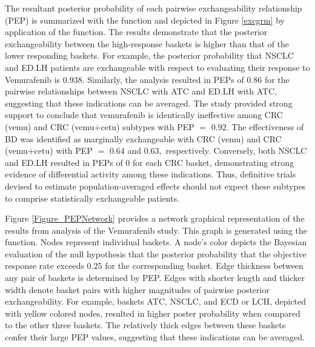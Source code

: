 The resultant posterior probability of each pairwise exchangeability relationship (PEP) is summarized with the  function and depicted in Figure \ref{excgrm} by application of the  function. The results demonstrate that the posterior exchangeability between the high-response baskets is higher than that of the lower responding baskets. For example, the posterior probability that NSCLC and ED.LH patients are exchangeable with respect to evaluating their response to Vemurafenib is 0.938. Similarly, the analysis resulted in PEPs of 0.86 for the pairwise relationships between NSCLC with ATC and ED.LH with ATC, suggesting that these indications can be averaged. The study provided strong support to conclude that vemurafenib is identically ineffective among CRC (vemu) and CRC (vemu+cetu) subtypes with PEP $=$ $0.92.$ The effectiveness of BD was identified as marginally exchangeable with CRC (vemu) and CRC (vemu+cetu) with PEP $=$ $0.64$ and $0.63,$ respectively. Conversely, both NSCLC and ED.LH resulted in PEPs of 0 for each CRC basket, demonstrating strong evidence of differential activity among these indications. Thus, definitive trials devised to estimate population-averaged effects should not expect these subtypes to comprise statistically exchangeable patients. 

Figure \ref{Figure_PEPNetwork} provides a network graphical representation of the results from analysis of the Vemurafenib study. This graph is generated using the  function. Nodes represent individual baskets. A node's color depicts the Bayesian evaluation of the null hypothesis that the posterior probability that the objective response rate exceeds $0.25$ for the corresponding basket. Edge thickness between any pair of baskets is determined by PEP. Edges with shorter length and thicker width denote basket pairs with higher magnitudes of pairwise posterior exchangeability. For example, baskets ATC, NSCLC, and ECD or LCH, depicted with yellow colored nodes, resulted in higher poster probability when compared to the other three baskets. The relatively thick edges between these baskets confer their large PEP values, suggesting that these indications can be averaged.

